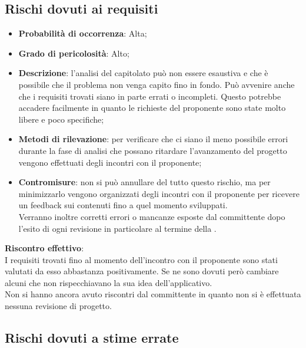 		
	\subsection{Rischi dovuti ai requisiti} %
	\label{sub:rischi_dovuti_ai_requisiti}
		\begin{itemize}
			\item \textbf{Probabilità di occorrenza}: Alta;
			\item \textbf{Grado di pericolosità}: Alto;
			\item \textbf{Descrizione}: l'analisi del capitolato può non essere esaustiva e che è possibile che il problema non venga capito fino in fondo. Può avvenire anche che i requisiti trovati siano in parte errati o incompleti. Questo potrebbe accadere facilmente in quanto le richieste del proponente\gloss{} sono state molto libere e poco specifiche;
			\item \textbf{Metodi di rilevazione}: per verificare che ci siano il meno possibile errori durante la fase di analisi che possano ritardare l'avanzamento del progetto vengono effettuati degli incontri con il proponente\gloss{};
			\item \textbf{Contromisure}: non si può annullare del tutto questo rischio, ma per minimizzarlo vengono organizzati degli incontri con il proponente\gloss{} per ricevere un feedback sui contenuti fino a quel momento sviluppati. \\
			Verranno inoltre corretti errori o mancanze esposte dal committente\gloss{} dopo l'esito di ogni revisione in particolare al termine della \RR.			
		\end{itemize}
	\noindent
	\textbf{Riscontro effettivo}: \\
	I requisiti trovati fino al momento dell'incontro con il proponente\gloss{} sono stati valutati da esso abbastanza positivamente. Se ne sono dovuti però cambiare alcuni che non rispecchiavano la sua idea dell'applicativo.  \\
	Non si hanno ancora avuto riscontri dal committente\gloss{} in quanto non si è effettuata nessuna revisione di progetto.
	
	\subsection{Rischi dovuti a stime errate} %
	\label{sub:rischi_dovuti_a_stime_errate}
